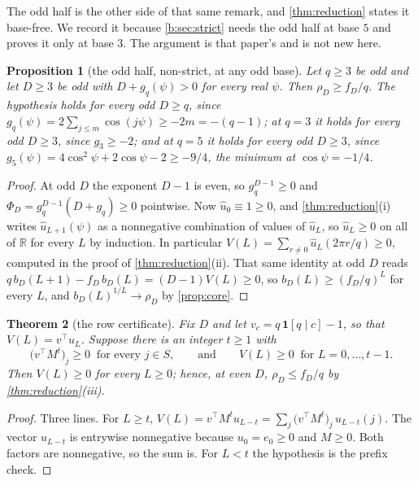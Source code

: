 \documentclass[11pt]{amsart}
\newtheorem{theorem}{Theorem}[section]
\newtheorem{proposition}[theorem]{Proposition}
\theoremstyle{definition}
\theoremstyle{remark}
\begin{document}
The odd half is the other side of that same remark, and \cref{thm:reduction} states it base-free. We record it because \cref{b:sec:strict} needs the odd half at base $5$ and \cite{slice-order} proves it only at base $3$. The argument is that paper's and is not new here.

\begin{proposition}[the odd half, non-strict, at any odd base]
\label{prop:oddhalf}
Let $q \ge 3$ be odd and let $D \ge 3$ be odd with $D + g_q(\psi) > 0$ for every real $\psi$. Then $\rho_D \ge f_D/q$. The hypothesis holds for every odd $D \ge q$, since $g_q(\psi) = 2\sum_{j \le m}\cos(j\psi) \ge -2m = -(q-1)$; at $q = 3$ it holds for every odd $D \ge 3$, since $g_3 \ge -2$; and at $q = 5$ it holds for every odd $D \ge 3$, since $g_5(\psi) = 4\cos^2\psi + 2\cos\psi - 2 \ge -9/4$, the minimum at $\cos\psi = -1/4$.
\end{proposition}

\begin{proof}
At odd $D$ the exponent $D-1$ is even, so $g_q^{D-1} \ge 0$ and $\Phi_D = g_q^{D-1}(D + g_q) \ge 0$ pointwise. Now $\hat u_0 \equiv 1 \ge 0$, and \cref{thm:reduction}(i) writes $\hat u_{L+1}(\psi)$ as a nonnegative combination of values of $\hat u_L$, so $\hat u_L \ge 0$ on all of $\mathbb R$ for every $L$ by induction. In particular $V(L) = \sum_{r \ne 0}\hat u_L(2\pi r/q) \ge 0$, computed in the proof of \cref{thm:reduction}(ii). That same identity at odd $D$ reads $q\,b_D(L+1) - f_D\,b_D(L) = (D-1)V(L) \ge 0$, so $b_D(L) \ge (f_D/q)^L$ for every $L$, and $b_D(L)^{1/L} \to \rho_D$ by \cref{prop:core}.
\end{proof}

\begin{theorem}[the row certificate]
\label{thm:row}
Fix $D$ and let $v_c = q\,\mathbf 1[q \mid c] - 1$, so that $V(L) = v^{\top}u_L$. Suppose there is an integer $t \ge 1$ with
\[
  \bigl(v^{\top}M^{t}\bigr)_j \ge 0 \ \text{ for every } j \in S, \qquad\text{and}\qquad V(L) \ge 0 \ \text{ for } L = 0,\dots,t-1.
\]
Then $V(L) \ge 0$ for every $L \ge 0$; hence, at even $D$, $\rho_D \le f_D/q$ by \cref{thm:reduction}(iii).
\end{theorem}

\begin{proof}
Three lines. For $L \ge t$, $V(L) = v^{\top}M^{t}u_{L-t} = \sum_j\bigl(v^{\top}M^t\bigr)_j\,u_{L-t}(j)$. The vector $u_{L-t}$ is entrywise nonnegative because $u_0 = e_0 \ge 0$ and $M \ge 0$. Both factors are nonnegative, so the sum is. For $L < t$ the hypothesis is the prefix check.
\end{proof}
\end{document}
